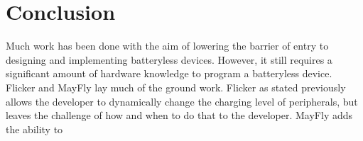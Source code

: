 \section{Conclusion} %
\label{sec:conclusion}

Much work has been done with the aim of lowering the barrier of entry to designing and implementing batteryless devices.
However, it still requires a significant amount of hardware knowledge to program a batteryless device.
Flicker and MayFly lay much of the ground work.
Flicker as stated previously allows the developer to dynamically change the charging level of peripherals, but leaves the challenge of how and when to do that to the developer.
MayFly adds the ability to 
